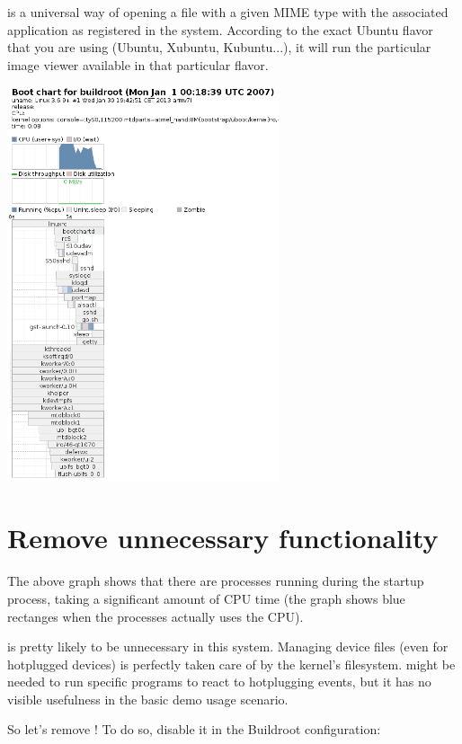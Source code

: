  is a universal way of opening a file with a given MIME
type with the associated application as registered in the system.
According to the exact Ubuntu flavor that you are using (Ubuntu,
Xubuntu, Kubuntu...), it will run the particular image viewer available in that
particular flavor. 

\begin{center}
\includegraphics[width=8cm]{labs/boottime-init-scripts/bootlog.png}
\end{center}

\section{Remove unnecessary functionality}

The above graph shows that there are  processes running 
during the startup process, taking a significant amount of CPU time
(the graph shows blue rectanges when the processes actually uses
the CPU). 

 is pretty likely to be unnecessary in this system. Managing
device files (even for hotplugged devices) is perfectly taken care
of by the kernel's  filesystem.  might be
needed to run specific programs to react to hotplugging events, but 
it has no visible usefulness in the basic demo usage scenario.

So let's remove ! To do so, disable it in the Buildroot
configuration:

